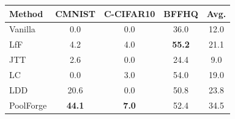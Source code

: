 \begin{tabular}{lcccc}
\toprule
Method & CMNIST & C-CIFAR10 & BFFHQ & Avg. \\
\midrule
Vanilla & 0.0 & 0.0 & 36.0 & 12.0 \\
LfF & 4.2 & 4.0 & \textbf{55.2} & 21.1 \\
JTT & 2.6 & 0.0 & 24.4 & 9.0 \\
LC & 0.0 & 3.0 & 54.0 & 19.0 \\
LDD & 20.6 & 0.0 & 50.8 & 23.8 \\
\rowcolor{ours}PoolForge & \textbf{44.1} & \textbf{7.0} & 52.4 & 34.5 \\
\bottomrule
\end{tabular}
